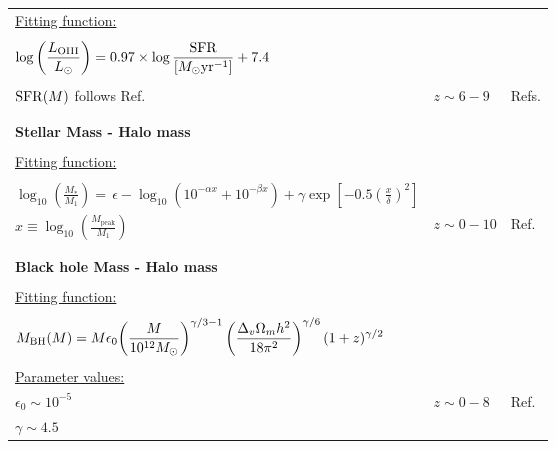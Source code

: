 \begin{longtable}{l|l|l}
       {\underline{Fitting function:}} &  & \\
      &&\\
     $\log\displaystyle{\left(\frac{L_{\rm OIII}}{L_{\odot}}\right)} = 0.97 
\times \log \displaystyle{\frac{\rm SFR}{[M_{\odot} \text{yr}^{-1}]}} + 7.4 $ \  & & \\ 
&&\\
${\rm SFR}(M)$ follows Ref. \cite{behroozi2019}   & $z \sim 6-9$ &  Refs. \cite{behroozi2019, harikane2020} \\
&&\\
      \hline
      &&\\
 {\large {\bf  Stellar Mass - Halo mass}}  &     \\
      & & \\
       {\underline{Fitting function:}} &  & \\
     &&\\
    $\log_{10}\displaystyle{\left(\frac{M_\ast}{M_1}\right)} =  \, \epsilon - \log_{10}\left(10^{-\alpha x} + 10^{-\beta x}\right) + \gamma\exp\left[-0.5\left(\frac{x}{\delta}\right)^2\right]$ & & \\
$x \equiv  \log_{10} \displaystyle{\left(\frac{M_\mathrm{peak}}{M_1}\right)}$ \ & $z \sim 0-10$ &  Ref. \cite{behroozi2019} \\ 
&&\\
      \hline
     &&\\
   {\large {\bf   Black hole Mass - Halo mass}}  &   &  \\
       & & \\
       {\underline{Fitting function:}} &  & \\
      &&\\
     $M_{\rm BH} (M) = M \epsilon_0 \displaystyle{\left(\frac{M}{10^{12} M_{\odot}}\right)^{\gamma/3 - 
1}} \left(\frac{\Delta_v \Omega_m h^2}{18 \pi^2}\right)^{\gamma/6} 
(1+z)^{\gamma/2} $ & & \\
& & \\
       {\underline{Parameter values:}} &  & \\
       $\epsilon_0 \sim 10^{-5}$ & $z \sim 0-8$ & Ref. \cite{wyithe2002}  \\
 $\gamma \sim 4.5$ &  &  
\label{table:constraints}
\\
\hline
\end{longtable}

